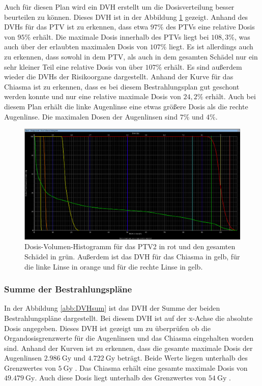 Auch für diesen Plan wird ein DVH erstellt um die Dosisverteilung besser beurteilen zu können.
Dieses DVH ist in der Abbildung \ref{abb:DVH2} gezeigt. Anhand des DVHs für das PTV ist zu erkennen, dass
etwa $97\%$ des PTVs eine relative Dosis von $95\%$ erhält. Die maximale Dosis innerhalb des PTVs liegt bei $108,3\%$, was auch über der erlaubten
maximalen Dosis von $107\%$ liegt. Es ist allerdings auch zu erkennen, dass sowohl in dem PTV, als auch in dem gesamten Schädel nur ein sehr kleiner
Teil eine relative Dosis von über $107\%$ erhält. Es sind außerdem wieder die DVHs der Risikoorgane dargestellt.
Anhand der Kurve für das Chiasma ist zu erkennen, dass es bei diesem Bestrahlungsplan gut geschont werden konnte und nur eine relative maximale
Dosis von $24,2\%$ erhält. Auch bei diesem Plan erhält die linke Augenlinse eine etwas größere Dosis als die rechte Augenlinse. Die maximalen Dosen
der Augenlinsen sind $7\%$ und $4\%$.

\begin{figure}[H]
  \centering
  \includegraphics[width=\textwidth]{Bilder/Teilhirn2_DVH.png}
  \caption{Dosis-Volumen-Histogramm für das PTV2 in rot und den gesamten Schädel in grün. Außerdem ist das DVH für das Chiasma in gelb, für die linke Linse in orange und für die rechte Linse in gelb.}
  \label{abb:DVH2}
\end{figure}


\subsubsection*{Summe der Bestrahlungspläne}

In der Abbildung \ref{abb:DVHsum} ist das DVH der Summe der beiden Bestrahlungspläne dargestellt.
Bei diesem DVH ist auf der x-Achse die absolute Dosis angegeben. Dieses DVH ist gezeigt um zu überprüfen ob
die Organdosisgrenzwerte für die Augenlinsen und das Chiasma eingehalten worden sind.
Anhand der Kurven ist zu erkennen, dass die gesamte maximale Dosis der Augenlinsen $\SI{2.986}{\gray}$ und $\SI{4.722}{\gray}$ beträgt.
Beide Werte liegen unterhalb des Grenzwertes von $\SI{5}{\gray}$ \cite{grenz}. 
Das Chiasma erhält eine gesamte maximale Dosis von $\SI{49.479}{\gray}$. Auch diese Dosis liegt unterhalb
des Grenzwertes von $\SI{54}{\gray}$ \cite{grenz}.

